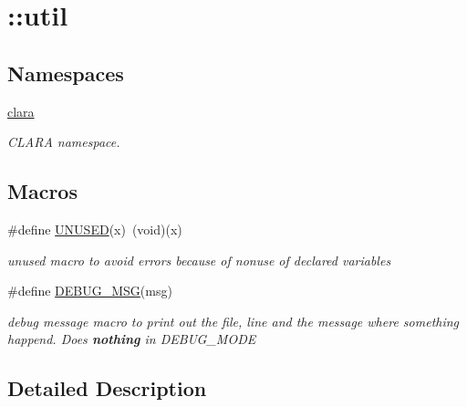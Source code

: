 \hypertarget{group__clara}{}\section{\+:\+:util}
\label{group__clara}
\subsection*{Namespaces}
\begin{DoxyCompactItemize}
\item 
 \hyperlink{namespaceclara}{clara}
\begin{DoxyCompactList}\small\item\em C\+L\+A\+RA namespace. \end{DoxyCompactList}\end{DoxyCompactItemize}
\subsection*{Macros}
\begin{DoxyCompactItemize}
\item 
\mbox{\label{group__clara_ga86d500a34c624c2cae56bc25a31b12f3}} 
\#define \hyperlink{group__clara_ga86d500a34c624c2cae56bc25a31b12f3}{U\+N\+U\+S\+ED}(x)~(void)(x)
\begin{DoxyCompactList}\small\item\em unused macro to avoid errors because of nonuse of declared variables \end{DoxyCompactList}\item 
\mbox{\label{group__clara_ga1ea6d4c0f0217715d1f79f1cf57e9c50}} 
\#define \hyperlink{group__clara_ga1ea6d4c0f0217715d1f79f1cf57e9c50}{D\+E\+B\+U\+G\+\_\+\+M\+SG}(msg)
\begin{DoxyCompactList}\small\item\em debug message macro to print out the file, line and the message where something happend. Does {\bfseries nothing} in D\+E\+B\+U\+G\+\_\+\+M\+O\+DE \end{DoxyCompactList}\end{DoxyCompactItemize}


\subsection{Detailed Description}
